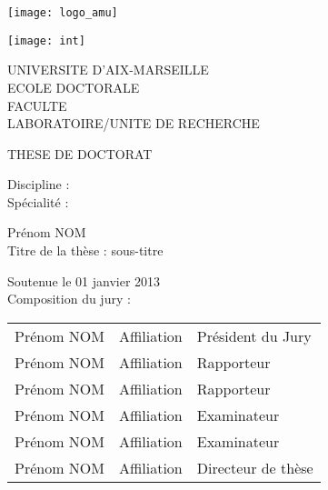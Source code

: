 \titlepage
{}\selectfont{}
\vspace*{-2cm}
\begin{center}
	\begin{minipage}[c]{0.50\linewidth}
		\raggedright \texttt{[image: logo\_amu]}
	\end{minipage}\hfill
	\begin{minipage}[c]{0.50\linewidth}
		\raggedleft \texttt{[image: int]}
	\end{minipage}\hfill 
\end{center}
\begin{flushleft}
	\vspace{0.2cm}
	\LARGE UNIVERSITE D’AIX-MARSEILLE\\
	\vspace{0.2cm}
	\Large ECOLE DOCTORALE\\
	\vspace{0.2cm}
	\normalsize FACULTE\\
	\vspace{0.2cm}
	LABORATOIRE/UNITE DE RECHERCHE\\
    \begin{center}
		\vspace{2cm}
		THESE DE DOCTORAT\\
    \end{center}
	\vspace{0.5cm}
    Discipline :\\
    Spécialité :\\
    \begin{center}
        \vspace{0.5cm}
        \Large Prénom NOM\\
        \vspace{1cm}
        \large Titre de la thèse : sous-titre\\
    \end{center}
	\vspace{3cm}
    \normalsize Soutenue le 01 janvier 2013\\
	\vspace{0.4cm}
    Composition du jury :\\
\end{flushleft}
\vspace{0.4cm}
\begin{tabular}{lll}
	Prénom NOM & Affiliation & Président du Jury \\
    \vspace{0.08cm}
	Prénom NOM & Affiliation & Rapporteur \\
    \vspace{0.08cm}
	Prénom NOM & Affiliation & Rapporteur \\
    \vspace{0.08cm}
	Prénom NOM & Affiliation & Examinateur \\
    \vspace{0.08cm}
	Prénom NOM & Affiliation & Examinateur \\
    \vspace{0.08cm}
	Prénom NOM & Affiliation & Directeur de thèse \\
\end{tabular}
\selectfont{}
